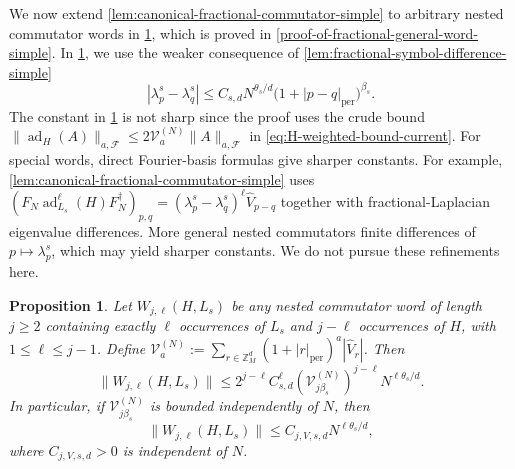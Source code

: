 \documentclass[10pt,reqno]{article}
\numberwithin{equation}{section}
\theoremstyle{plain}
\newtheorem{prop}[thm]{Proposition}
\theoremstyle{definition}
\begin{document}
We now extend \cref{lem:canonical-fractional-commutator-simple} to arbitrary nested commutator words in \cref{fractional-general-word-simple}, which is proved in \cref{proof-of-fractional-general-word-simple}. In \cref{fractional-general-word-simple}, we use the weaker consequence of \cref{lem:fractional-symbol-difference-simple}
\begin{equation}\label{eq:fractional-symbol-difference-weak}
|\lambda_p^s-\lambda_q^s|
\leq
C_{s,d}N^{\theta_s/d}\bigl(1+|p-q|_{\operatorname{per}}\bigr)^{\beta_s}.
\end{equation}
The constant in \cref{fractional-general-word-simple} is not sharp since the proof uses the crude bound \(\|\operatorname{ad}_H(A)\|_{a,\mathcal F}\leq2\mathcal V_a^{(N)}\|A\|_{a,\mathcal F}\) in \cref{eq:H-weighted-bound-current}. For special words, direct Fourier-basis formulas give sharper constants. For example, \cref{lem:canonical-fractional-commutator-simple} uses \((F_N\operatorname{ad}_{L_s}^{\ell}(H)F_N^\dagger)_{p,q}=(\lambda_p^s-\lambda_q^s)^\ell\widehat V_{p-q}\) together with fractional-Laplacian eigenvalue differences. More general nested commutators finite differences of \(p\mapsto\lambda_p^s\), which may yield sharper constants. We do not pursue these refinements here.

\begin{prop}\label{fractional-general-word-simple}
Let \(W_{j,\ell}(H,L_s)\) be any nested commutator word of length \(j\geq2\) containing exactly \(\ell\) occurrences of \(L_s\) and \(j-\ell\) occurrences of \(H\), with \(1\leq \ell\leq j-1\). Define
$\mathcal V_a^{(N)} := \sum_{r\in\mathbb Z_M^d} \left(1+|r|_{\operatorname{per}}\right)^a |\widehat V_r|$. 
Then
\begin{equation}
\|W_{j,\ell}(H,L_s)\| \leq 2^{j-\ell} C_{s,d}^{\ell} (\mathcal V_{j\beta_s}^{(N)} )^{j-\ell} N^{\ell\theta_s/d}.
\end{equation}
In particular, if \(\mathcal V_{j\beta_s}^{(N)}\) is bounded independently of \(N\), then
\begin{equation}
\|W_{j,\ell}(H,L_s)\| \leq C_{j,V,s,d}N^{\ell\theta_s/d},
\end{equation}
where \(C_{j,V,s,d} > 0\) is independent of \(N\).
\end{prop}
\end{document}
